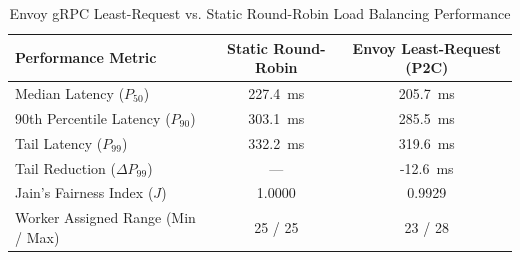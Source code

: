 \begin{table}[t]
\centering
\caption{Envoy gRPC Least-Request vs. Static Round-Robin Load Balancing Performance}
\label{tab:envoy_balancing_eval}
\begin{tabular}{lcc}
\hline
\textbf{Performance Metric} & \textbf{Static Round-Robin} & \textbf{Envoy Least-Request (P2C)} \\
\hline
Median Latency ($P_{50}$) & 227.4~ms & 205.7~ms \\
90th Percentile Latency ($P_{90}$) & 303.1~ms & 285.5~ms \\
Tail Latency ($P_{99}$) & 332.2~ms & 319.6~ms \\
Tail Reduction ($\Delta P_{99}$) & --- & -12.6~ms \\
Jain's Fairness Index ($J$) & 1.0000 & 0.9929 \\
Worker Assigned Range (Min / Max) & 25 / 25 & 23 / 28 \\
\hline
\end{tabular}
\end{table}

